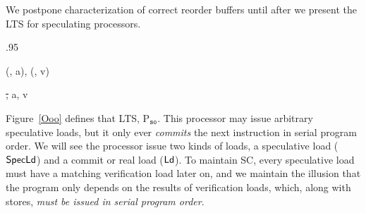We postpone characterization of correct reorder buffers until after we
present the LTS for speculating processors.

\begin{figure*}[t]
\centering
\begin{boxedminipage}[c]{.95\textwidth}
\inference[Fetch]
{}
{}

\inference[Compute]
{\get\spc\ld(\rob) = \epsilon}
{}

{
{(\ld\req, a), (\ld\resp, v)}}


{}

{}

{}

{
{\st, a, v}}

{}

{}
\end{boxedminipage}

\caption{Speculating, out-of-order issue processor}
\label{Ooo}
\end{figure*}

Figure~\ref{Ooo} defines that LTS,
P$_{\texttt{so}}$. This processor may issue arbitrary speculative
loads, but it only ever \emph{commits} the next instruction in serial
program order. 
We will see the processor issue two kinds of loads, a speculative
load ($\mathsf{Spec}\mathsf{Ld}$) and a commit or real load ($\mathsf{Ld}$).  To maintain SC, every speculative
load must have a matching verification load later on, and we maintain
the illusion that the program only depends on the results of
verification loads, which, along with stores, \emph{must be issued in
serial program order}.


